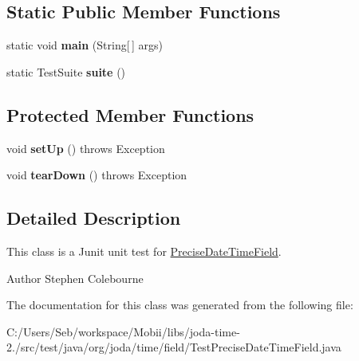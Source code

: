 \subsection*{Static Public Member Functions}
\begin{DoxyCompactItemize}
\item 
\hypertarget{classorg_1_1joda_1_1time_1_1field_1_1_test_precise_date_time_field_a2c9dea3e7f1cb9e591c3a243f9b32259}{static void {\bfseries main} (String\mbox{[}$\,$\mbox{]} args)}\label{classorg_1_1joda_1_1time_1_1field_1_1_test_precise_date_time_field_a2c9dea3e7f1cb9e591c3a243f9b32259}

\item 
\hypertarget{classorg_1_1joda_1_1time_1_1field_1_1_test_precise_date_time_field_a0c338a13bb8693cc8ebde037ede3c3a5}{static Test\-Suite {\bfseries suite} ()}\label{classorg_1_1joda_1_1time_1_1field_1_1_test_precise_date_time_field_a0c338a13bb8693cc8ebde037ede3c3a5}

\end{DoxyCompactItemize}
\subsection*{Protected Member Functions}
\begin{DoxyCompactItemize}
\item 
\hypertarget{classorg_1_1joda_1_1time_1_1field_1_1_test_precise_date_time_field_a019a18d6741280b96494f661d23b95cd}{void {\bfseries set\-Up} ()  throws Exception }\label{classorg_1_1joda_1_1time_1_1field_1_1_test_precise_date_time_field_a019a18d6741280b96494f661d23b95cd}

\item 
\hypertarget{classorg_1_1joda_1_1time_1_1field_1_1_test_precise_date_time_field_ae2687d516201ef5890d19c77d1aa98ad}{void {\bfseries tear\-Down} ()  throws Exception }\label{classorg_1_1joda_1_1time_1_1field_1_1_test_precise_date_time_field_ae2687d516201ef5890d19c77d1aa98ad}

\end{DoxyCompactItemize}


\subsection{Detailed Description}
This class is a Junit unit test for \hyperlink{classorg_1_1joda_1_1time_1_1field_1_1_precise_date_time_field}{Precise\-Date\-Time\-Field}.

\begin{DoxyAuthor}{Author}
Stephen Colebourne 
\end{DoxyAuthor}


The documentation for this class was generated from the following file\-:\begin{DoxyCompactItemize}
\item 
C\-:/\-Users/\-Seb/workspace/\-Mobii/libs/joda-\/time-\/2./src/test/java/org/joda/time/field/Test\-Precise\-Date\-Time\-Field.\-java\end{DoxyCompactItemize}
